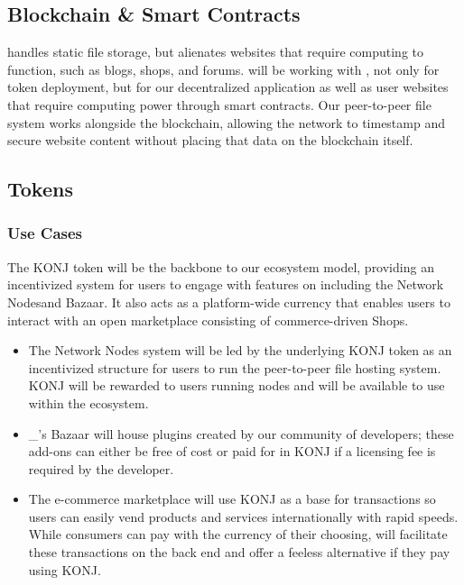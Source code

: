 \documentclass{kwp-builder}
\begin{document}
\subsection{Blockchain \& Smart Contracts}

\tab \ipfs handles static file storage, but alienates websites that require computing to function, such as blogs, shops, and forums. \konjure will be working with \cardano, not only for token deployment, but for our decentralized application as well as user websites that require computing power through smart contracts. Our peer-to-peer file system works alongside the blockchain, allowing the network to timestamp and secure website content without placing that data on the blockchain itself.

\newpage

\subsection{Tokens}
\subsubsection{Use Cases}


\tab The KONJ token will be the backbone to our ecosystem model, providing an incentivized system for users to engage with features on \konjure including the Network Nodes\kNodeReward and Bazaar\kBazaar{}. It also acts as a platform-wide currency that enables users to interact with an open marketplace consisting of commerce-driven \konjure Shops\kShops{}.

\begin{itemize}
	\item The Network Nodes system will be led by the underlying KONJ token as an incentivized structure for users to run the peer-to-peer file hosting system. KONJ will be rewarded to users running nodes and will be available to use within the ecosystem.
	
	\item \konjure\_{’}s Bazaar will house plugins created by our community of developers; these add-ons can either be free of cost or paid for in KONJ if a licensing fee is required by the developer.
	
	\item The e-commerce marketplace will use KONJ as a base for transactions so users can easily vend products and services internationally with rapid speeds. While consumers can pay with the currency of their choosing, \konjure will facilitate these transactions on the back end and offer a feeless alternative if they pay using KONJ.
\end{itemize}
\end{document}
